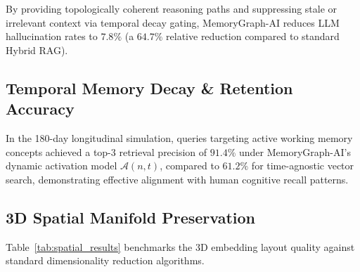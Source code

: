 \begin{table}[t]
\centering
\caption{Generation Quality and Faithfulness (RAGAS Metrics with GPT-4o)}
\label{tab:ragas_results}
\end{table}

By providing topologically coherent reasoning paths and suppressing stale or irrelevant context via temporal decay gating, MemoryGraph-AI reduces LLM hallucination rates to $7.8\%$ (a $64.7\%$ relative reduction compared to standard Hybrid RAG).

\subsection{Temporal Memory Decay \& Retention Accuracy}
In the 180-day longitudinal simulation, queries targeting active working memory concepts achieved a top-3 retrieval precision of $91.4\%$ under MemoryGraph-AI's dynamic activation model $\mathcal{A}(n, t)$, compared to $61.2\%$ for time-agnostic vector search, demonstrating effective alignment with human cognitive recall patterns.

\subsection{3D Spatial Manifold Preservation}
Table~\ref{tab:spatial_results} benchmarks the 3D embedding layout quality against standard dimensionality reduction algorithms.

\begin{table}[t]
\centering
\caption{3D Spatial Layout Manifold Preservation Metrics}
\label{tab:spatial_results}
\end{table}


